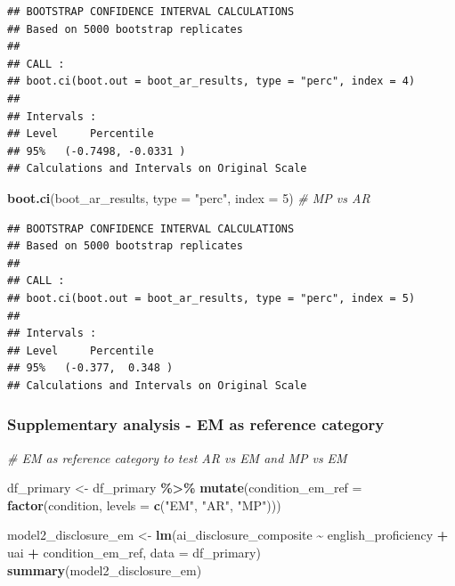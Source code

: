 \documentclass[
]{article}
\newenvironment{Shaded}{\begin{snugshade}}{\end{snugshade}}
\newcommand{\AttributeTok}[1]{\textcolor[rgb]{0.13,0.29,0.53}{#1}}
\newcommand{\CommentTok}[1]{\textcolor[rgb]{0.56,0.35,0.01}{\textit{#1}}}
\newcommand{\DecValTok}[1]{\textcolor[rgb]{0.00,0.00,0.81}{#1}}
\newcommand{\FunctionTok}[1]{\textcolor[rgb]{0.13,0.29,0.53}{\textbf{#1}}}
\newcommand{\NormalTok}[1]{#1}
\newcommand{\OtherTok}[1]{\textcolor[rgb]{0.56,0.35,0.01}{#1}}
\newcommand{\SpecialCharTok}[1]{\textcolor[rgb]{0.81,0.36,0.00}{\textbf{#1}}}
\newcommand{\StringTok}[1]{\textcolor[rgb]{0.31,0.60,0.02}{#1}}
\begin{document}
\begin{verbatim}
## BOOTSTRAP CONFIDENCE INTERVAL CALCULATIONS
## Based on 5000 bootstrap replicates
## 
## CALL : 
## boot.ci(boot.out = boot_ar_results, type = "perc", index = 4)
## 
## Intervals : 
## Level     Percentile     
## 95%   (-0.7498, -0.0331 )  
## Calculations and Intervals on Original Scale
\end{verbatim}

\begin{Shaded}
\begin{Highlighting}[]
\FunctionTok{boot.ci}\NormalTok{(boot\_ar\_results, }\AttributeTok{type =} \StringTok{"perc"}\NormalTok{, }\AttributeTok{index =} \DecValTok{5}\NormalTok{) }\CommentTok{\# MP vs AR}
\end{Highlighting}
\end{Shaded}

\begin{verbatim}
## BOOTSTRAP CONFIDENCE INTERVAL CALCULATIONS
## Based on 5000 bootstrap replicates
## 
## CALL : 
## boot.ci(boot.out = boot_ar_results, type = "perc", index = 5)
## 
## Intervals : 
## Level     Percentile     
## 95%   (-0.377,  0.348 )  
## Calculations and Intervals on Original Scale
\end{verbatim}

\subsubsection{Supplementary analysis - EM as reference
category}\label{supplementary-analysis---em-as-reference-category}

\begin{Shaded}
\begin{Highlighting}[]
\CommentTok{\# EM as reference category to test AR vs EM and MP vs EM }

\NormalTok{df\_primary }\OtherTok{\textless{}{-}}\NormalTok{ df\_primary }\SpecialCharTok{\%\textgreater{}\%}
  \FunctionTok{mutate}\NormalTok{(}\AttributeTok{condition\_em\_ref =} \FunctionTok{factor}\NormalTok{(condition, }\AttributeTok{levels =} \FunctionTok{c}\NormalTok{(}\StringTok{"EM"}\NormalTok{, }\StringTok{"AR"}\NormalTok{, }\StringTok{"MP"}\NormalTok{)))}

\NormalTok{model2\_disclosure\_em }\OtherTok{\textless{}{-}} \FunctionTok{lm}\NormalTok{(ai\_disclosure\_composite }\SpecialCharTok{\textasciitilde{}}\NormalTok{ english\_proficiency }\SpecialCharTok{+}\NormalTok{ uai }\SpecialCharTok{+}\NormalTok{ condition\_em\_ref, }\AttributeTok{data =}\NormalTok{ df\_primary)}
\FunctionTok{summary}\NormalTok{(model2\_disclosure\_em)}
\end{Highlighting}
\end{Shaded}
\end{document}
